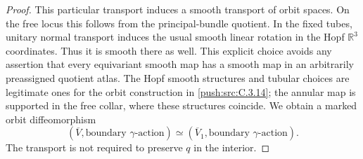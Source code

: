 \begin{proof}
This particular transport induces a smooth transport of orbit
spaces. On the free locus this follows from the principal-bundle
quotient. In the fixed tubes, unitary normal transport induces
the usual smooth linear rotation in the Hopf $\mathbb R^3$
coordinates. Thus it is smooth there as well. This explicit
choice avoids any assertion that every equivariant smooth map
has a smooth map in an arbitrarily preassigned quotient atlas.
The Hopf smooth structures and tubular choices are legitimate
ones for the orbit construction in \ref{push:src:C.3.14}; the annular map is
supported in the free collar, where these structures coincide.
We obtain a marked orbit diffeomorphism
\[
 (\overline V,\text{boundary }\gamma\text{-action})
 \simeq(\overline V_1,\text{boundary }\gamma\text{-action}).
\]
The transport is not required to preserve $q$ in the interior.


\end{proof}
